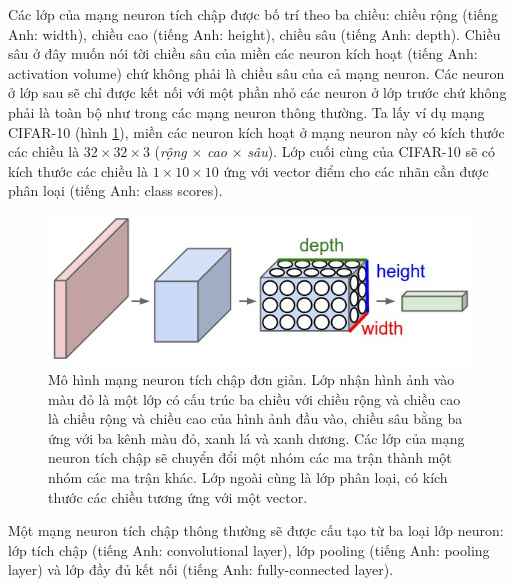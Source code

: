 Các lớp của mạng neuron tích chập được bố trí theo ba chiều: chiều rộng (tiếng Anh: width), chiều cao (tiếng Anh: height), chiều sâu (tiếng Anh: depth). Chiều sâu ở đây muốn nói tời chiều sâu của miền các neuron kích hoạt (tiếng Anh: activation volume) chứ không phải là chiều sâu của cả mạng neuron. Các neuron ở lớp sau sẽ chỉ được kết nối với một phần nhỏ các neuron ở lớp trước chứ không phải là toàn bộ như trong các mạng neuron thông thường. Ta lấy ví dụ mạng CIFAR-10 (hình \ref{fig:cnn}), miền các neuron kích hoạt ở mạng neuron này có kích thước các chiều là $32{\times}32{\times}3$ (\emph{rộng} ${\times}$ \emph{cao} ${\times}$ \emph{sâu}). Lớp cuối cùng của CIFAR-10 sẽ có kích thước các chiều là $1{\times}10{\times}10$ ứng với vector điểm cho các nhãn cần được phân loại (tiếng Anh: class scores).
\begin{figure}[ht!]
	\centerline{\includegraphics[scale=0.6]{images/cnn.jpeg}}
  	\caption{Mô hình mạng neuron tích chập đơn giản. Lớp nhận hình ảnh vào màu đỏ là một lớp có cấu trúc ba chiều với chiều rộng và chiều cao là chiều rộng và chiều cao của hình ảnh đầu vào, chiều sâu bằng ba ứng với ba kênh màu đỏ, xanh lá và xanh dương. Các lớp của mạng neuron tích chập sẽ chuyển đổi một nhóm các ma trận thành một nhóm các ma trận khác. Lớp ngoài cùng là lớp phân loại, có kích thước các chiều tương ứng với một vector.}
  	\label{fig:cnn}
\end{figure}
Một mạng neuron tích chập thông thường sẽ được cấu tạo từ ba loại lớp neuron\cite[p.113:123]{tuan:2019}: lớp tích chập (tiếng Anh: convolutional layer), lớp pooling (tiếng Anh: pooling layer) và lớp đầy đủ kết nối (tiếng Anh: fully-connected layer).
